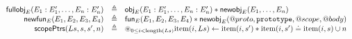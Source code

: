 \documentclass[a4paper]{article}
\begin{document}
\begin{displaymath}
  \begin{array}{rcl}
  \mathsf{fullobj}_{E}(E_1:E_1',\dots,E_n:E_n') &\triangleq&
    \mathsf{obj}_{E}(E_1:E_1',\dots,E_n:E_n') \mathbin{*} \mathsf{newobj}_{E}(E_1,\dots,E_n) \\
  \mathsf{newfun}_{E}(E_1,E_2,E_3,E_4) &\triangleq& \mathsf{fun}_{E}(E_1,E_2,E_3,E_4) \mathbin{*}
    \mathsf{newobj}_{E}(@proto, \mbox{\texttt{{\upshape prototype}}}, @scope, @body) \\
  \mathsf{scopePtrs}(Ls, s, s', n) &\triangleq& \circledast_{0\leq i<\text{length}(Ls)}
    \text{item}(i,Ls) \leftarrow \text{item}(i,s') \mathbin{*} \text{item}(i,s') \doteq \text{item}(i,s) \cup n
\end{array}
\end{displaymath}

%
\end{document}
